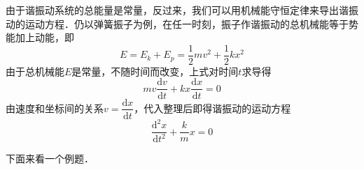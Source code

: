 

由于谐振动系统的总能量是常量，反过来，我们可以用机械能守恒定律来导出谐振动的运动方程．仍以弹簧振子为例，在任一时刻，振子作谐振动的总机械能等于势能加上动能，即
\begin{equation}
E=E_k+E_p=\frac{1}{2} m v^{2}+\frac{1}{2} k x^{2}
\end{equation}
由于总机械能$E$是常量，不随时间而改变，上式对时间$t$求导得
\begin{equation}
m v \frac{\mathrm{d} v}{\mathrm{d} t}+k x \frac{\mathrm{d} x}{\mathrm{d} t}=0
\end{equation}
由速度和坐标间的关系$v = \dfrac{\mathrm d x}{\mathrm dt}$，代入整理后即得谐振动的运动方程
\begin{equation}
\frac{\mathrm{d}^{2} x}{\mathrm{d} t^{2}}+\frac{k}{m} x=0
\end{equation}

下面来看一个例题．

